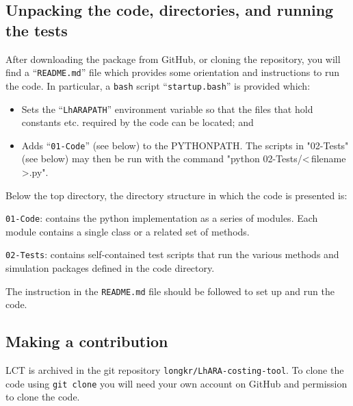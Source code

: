 \subsection*{\color{DarkGreen} Unpacking the code, directories, and running the tests}
After downloading the package from GitHub, or cloning the repository,
you will find a ``\verb+README.md+'' file which provides some orientation
and instructions to run the code.
In particular, a \verb+bash+ script ``\verb+startup.bash+'' is
provided which:
\begin{itemize}
  \item Sets the ``\verb+LhARAPATH+'' environment variable so that the
    files that hold constants etc. required by the code can be
    located; and
  \item Adds ``\verb+01-Code+'' (see below) to the PYTHONPATH.
    The scripts in "02-Tests" (see below) may then be run with the
    command "python 02-Tests/\textless\,filename\,\textgreater.py".
\end{itemize}
Below the top directory, the directory structure in which the code is
presented is:
\begin{description}
  \item\verb+01-Code+: contains the python implementation as a
    series of modules.
    Each module contains a single class or a related set of methods.
  \item\verb+02-Tests+: contains self-contained test scripts that
    run the various methods and simulation packages defined in the
    code directory.
\end{description}
The instruction in the \verb+README.md+ file should be followed to set
up and run the code.
  
\subsection*{\color{DarkGreen} Making a contribution}
LCT is archived in the git repository \verb+longkr/LhARA-costing-tool+.
To clone the code using
\verb+git clone+ you will need your own account on GitHub and
permission to clone the code. 
